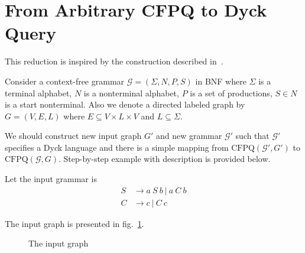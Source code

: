 \section{From Arbitrary CFPQ to Dyck Query}\label{sec:cfpq_to_dyck}

This reduction is inspired by the construction described in~\cite{OptimalDLR}.

Consider a context-free grammar $\mathcal{G}=(\Sigma, N, P, S)$ in BNF where $\Sigma$ is a terminal alphabet, $N$ is 
a nonterminal alphabet, $P$ is a set of productions, $S \in N$ is a start nonterminal.
Also we denote a directed labeled graph by $G=(V,E,L)$ where $E \subseteq V \times L \times V$ and $L \subseteq \Sigma$. 

We should construct new input graph $G'$ and new grammar $\mathcal{G'}$ such that $\mathcal{G'}$ specifies a Dyck language and there is a simple mapping from $\text{CFPQ}(\mathcal{G'}, G')$ to $\text{CFPQ}(\mathcal{G}, G)$.
Step-by-step example with description is provided below.
 
Let the input grammar is 
\begin{align*}
S & \rightarrow a \ S \ b \ | \ a \ C \ b 
\\
C & \rightarrow c \ | \ C \ c
\end{align*}

The input graph is presented in fig.~\ref{input}.

\begin{figure}
\resizebox{.5\textwidth}{!}
{
}

\caption{The input graph}
\label{input}
\end{figure}

